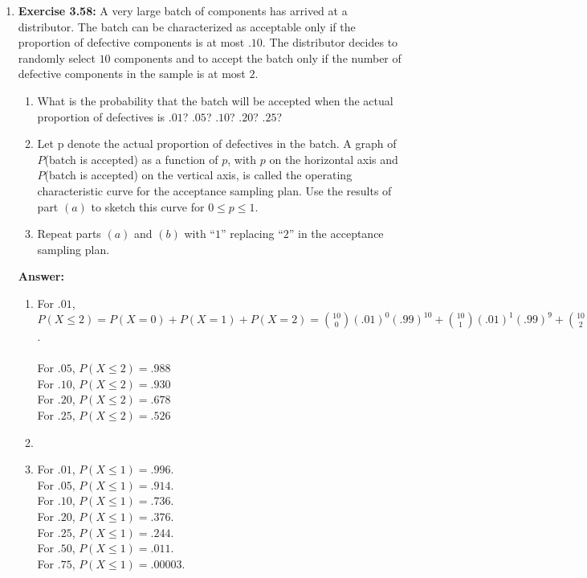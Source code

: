 \documentclass[12pt]{article}
\theoremstyle{homework}
\begin{document}
\begin{enumerate}
\item\hspace{.5in}\textbf{Exercise 3.58:} A very large batch of components has arrived at a distributor. The batch can be characterized as acceptable only if the proportion of defective components is at most $.10$. The distributor decides to randomly select $10$ components and to accept the batch only if the number of defective components in the sample is at most $2$.
\begin{enumerate}
\item What is the probability that the batch will be accepted when the actual proportion of defectives is $.01$? $.05$? $.10$? $.20$? $.25$?
\item Let p denote the actual proportion of defectives in the batch. A graph of $P$(batch is accepted) as a function of $p$, with $p$ on the horizontal axis and $P$(batch is accepted) on the vertical axis, is called the operating characteristic curve for the acceptance sampling plan. Use the results of part $(a)$ to sketch this curve for $0 \le p \le 1$.
\item Repeat parts $(a)$ and $(b)$ with “$1$” replacing “$2$” in the acceptance sampling plan.
\end{enumerate}
\textbf{Answer:} 
\begin{enumerate}
\item For $.01$, $P(X\le 2)=P(X=0)+P(X=1)+P(X=2)={10\choose 0}(.01)^0(.99)^10+{10\choose 1}(.01)^1(.99)^9+{10\choose 2}(.01)^2(.99)^8=.904+.091+.004=.999$.\\
\\
For $.05$, $P(X\le 2)=.988$\\
For $.10$, $P(X\le 2)=.930$\\
For $.20$, $P(X\le 2)=.678$\\
For $.25$, $P(X\le 2)=.526$\\
\item 


\item
For $.01$, $P(X\le 1)=.996$.\\
For $.05$, $P(X\le 1)=.914$.\\
For $.10$, $P(X\le 1)=.736$.\\
For $.20$, $P(X\le 1)=.376$.\\
For $.25$, $P(X\le 1)=.244$.\\
For $.50$, $P(X\le 1)=.011$.\\
For $.75$, $P(X\le 1)=.00003$.\\

\end{enumerate}
\vspace{.5in}









\end{enumerate}
\end{document}
